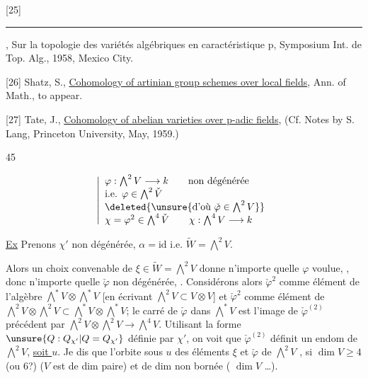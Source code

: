 [25] \rule{2cm}{0.4pt}, Sur la topologie des variétés algébriques en caractéristique p, Symposium Int. de Top. Alg., 1958, Mexico City.

[26] Shatz, S., \uline{Cohomology of artinian group schemes over local fields}, Ann. of Math., to appear.

[27] Tate, J., \uline{Cohomology of abelian varieties over p-adic fields}, (Cf. Notes by S. Lang, Princeton University, May, 1959.)

\begin{center}45\end{center}

\[
\left|\begin{array}{l}
\varphi:\bigwedge^2V\longrightarrow k\qquad\text{non dégénérée}\\
\text{i.e. }\varphi\in\bigwedge^2\check V\\
\deleted{\unsure{\text{d'où }\check\varphi\in\bigwedge^2V}}\\
\chi=\varphi^2\in\bigwedge^4\check V\qquad\chi:\bigwedge^4V\longrightarrow k
\end{array}\right.
\]

\uline{Ex} Prenons $\chi'$ non dégénérée,  $\alpha=\mathrm{id}$ i.e. $\widetilde W=\bigwedge^2V$.

Alors un choix convenable de $\xi\in\widetilde W=\bigwedge^2V$ donne n'importe quelle $\varphi$ voulue, , donc n'importe quelle $\check\varphi$  non dégénérée, . Considérons alors $\check\varphi^2$ comme élément de  l'algèbre $\bigwedge^*V\otimes\bigwedge^*V$ [en écrivant $\bigwedge^2V\subset V\otimes V$] et $\check\varphi^2$ comme élément de $\bigwedge^2V\otimes\bigwedge^2V\subset\bigwedge^*V\otimes\bigwedge^*V$; le carré de $\check\varphi$ dans $\bigwedge^*V$  est l'image de $\check\varphi^{(2)}$ précédent par $\bigwedge^2V\otimes\bigwedge^2V\longrightarrow\bigwedge^4V$. Utilisant la forme $\unsure{Q:Q_{\chi'}|Q=Q_{\chi'}}$ définie par $\chi'$, on voit que $\check\varphi^{(2)}$ définit un endom de $\bigwedge^2V$, \uline{soit $u$}. Je dis que l'orbite sous $u$ des éléments $\xi$ et $\check\varphi$ de $\bigwedge^2V$ , si $\dim V\geq4$ (ou $6$?) ($V$ est de dim paire) et   de dim non bornée ( $\dim V$ \ldots).
\deleted{$\unsure{\xi}$}

